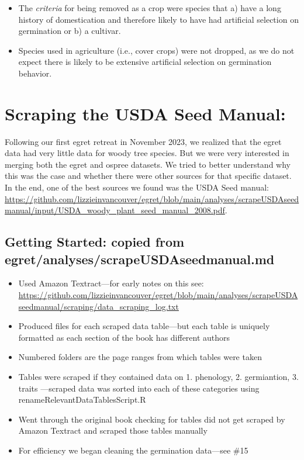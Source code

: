\documentclass{article}[12pt]
\begin{document}
\begin{enumerate}
\begin{itemize}
\begin{itemize}
\item The \emph{criteria} for being removed as a crop were species that a) have a long history of domestication and therefore likely to have had artificial selection on germination or b) a cultivar.
\item Species used in agriculture (i.e., cover crops) were not dropped, as we do not expect there is likely to be extensive artificial selection on germination behavior.
\end{itemize}
\end{itemize}
\end{enumerate}

\section*{Scraping the USDA Seed Manual: }

Following our first egret retreat in November 2023, we realized that the egret data had very little data for woody tree species. But we were very interested in merging both the egret and ospree datasets. We tried to better understand why this was the case and whether there were other sources for that specific dataset. In the end, one of the best sources we found was the USDA Seed manual: \url{https://github.com/lizzieinvancouver/egret/blob/main/analyses/scrapeUSDAseedmanual/input/USDA_woody_plant_seed_manual_2008.pdf}.

\subsection*{Getting Started: copied from egret/analyses/scrapeUSDAseedmanual.md}
\begin{itemize}
\item Used Amazon Textract---for early notes on this see: \url{https://github.com/lizzieinvancouver/egret/blob/main/analyses/scrapeUSDAseedmanual/scraping/data_scraping_log.txt}
\item Produced files for each scraped data table---but each table is uniquely formatted as each section of the book has different authors
\item Numbered folders are the page ranges from which tables were taken
\item Tables were scraped if they contained data on 1. phenology, 2. germiantion, 3. traits ---scraped data was sorted into each of these categories using renameRelevantDataTablesScript.R
\item Went through the original book checking for tables did not get scraped by Amazon Textract and scraped those tables manually

\item For efficiency we began cleaning the germination data---see \#15
\end{itemize}
\end{document}

